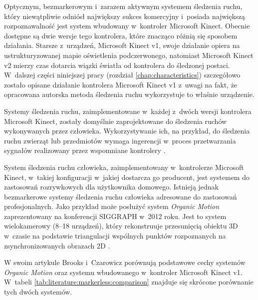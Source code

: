 Optycznym, bezmarkerowym i~zarazem aktywnym systemem śledzenia ruchu, który niewątpliwie odniósł największy sukces komercyjny i~posiada największą rozpoznawalność jest system wbudowany w~kontroler Microsoft Kinect. Obecnie dostępne są dwie wersje tego kontrolera, które znacząco różnią się sposobem działania. Starsze z~urządzeń, Microsoft Kinect v1, swoje działanie opiera na ustrukturyzowanej mapie oświetlenia podczerwonego, natomiast Microsoft Kinect v2 mierzy czas dotarcia wiązki światła od kontrolera do śledzonej postaci. W~dalszej części niniejszej pracy (rozdział \ref{chap:characteristics}) szczegółowo zostało opisane działanie kontrolera Microsoft Kinect v1 z~uwagi na fakt, że opracowana autorska metoda śledzenia ruchu wykorzystuje to właśnie urządzenie. 
			
Systemy śledzenia ruchu, zaimplementowane w~każdej z~dwóch wersji kontrolera Microsoft Kinect, zostały domyślnie zaprojektowane do śledzenia ruchów wykonywanych przez człowieka. Wykorzystywanie ich, na przykład, do śledzenia ruchu zwierząt lub przedmiotów wymaga ingerencji w~proces przetwarzania sygnałów realizowany przez wspomniane kontrolery \cite{Nirjon2012}.
			
System śledzenia ruchu człowieka, zaimplementowany w~kontrolerze Microsoft Kinect, w~takiej konfiguracji w~jakiej dostarcza go producent, jest systemem do zastosowań rozrywkowych dla użytkownika domowego. Istnieją jednak bezmarkerowe systemy śledzenia ruchu człowieka adresowane do zastosowań profesjonalnych. Jako przykład może posłużyć system \emph{Organic Motion} zaprezentowany na konferencji SIGGRAPH w~2012 roku. Jest to system wielokamerowy (8--18 urządzeń), który rekonstruuje przesunięcią obiektu 3D w~czasie na podstawie triangulacji wspólnych punktów rozpoznanych na zsynchronizowanych obrazach 2D \cite{Brooks2012}.
			
W swoim artykule Brooks i~Czarowicz \cite{Brooks2012} porównują podstawowe cechy systemów \emph{Organic Motion} oraz systemu wbudowanego w~kontroler Microsoft Kinect v1. W~tabeli \ref{tab:literature:markerless:comparison} znajduje się skrócone porównanie tych dwóch systemów. 
			
